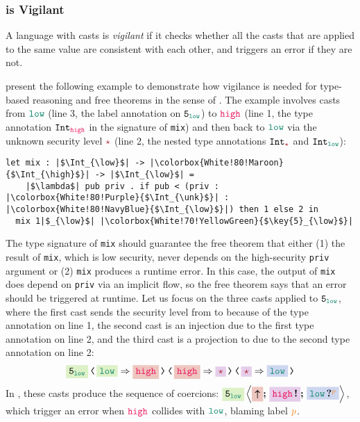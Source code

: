 \subsubsection{\Surface is Vigilant}

A language with casts is \textit{vigilant} if it checks whether all the casts
that are applied to the same value are consistent with each other, and triggers
an error if they are not.

\textcite{Toro:2018aa} present the following example to demonstrate how vigilance
is needed for type-based reasoning and free theorems in the sense of
\textcite{Wadler:1989fk}. The example involves casts from $\low$ (line 3, the label
annotation on $\key{5}_{\low}$) to $\high$ (line 1, the type annotation
$\Int_{\high}$ in the signature of \texttt{mix}) and then back to $\low$ via the
unknown security level $\unk$ (line 2, the nested type annotations $\Int_{\unk}$
and $\Int_{\low}$):

\begin{lstlisting}[style=tt]
  let mix : |$\Int_{\low}$| -> |\colorbox{White!80!Maroon}{$\Int_{\high}$}| -> |$\Int_{\low}$| =
    |$\lambda$| pub priv . if pub < (priv : |\colorbox{White!80!Purple}{$\Int_{\unk}$}| : |\colorbox{White!80!NavyBlue}{$\Int_{\low}$}|) then 1 else 2 in
  mix 1|$_{\low}$| |\colorbox{White!70!YellowGreen}{$\key{5}_{\low}$}|
\end{lstlisting}

\noindent The type signature of \texttt{mix} should guarantee the free theorem
that either (1) the result of \texttt{mix}, which is low security, never depends
on the high-security \texttt{priv} argument or (2) \texttt{mix} produces a
runtime error. In this case, the output of \texttt{mix} does depend on
\texttt{priv} via an implicit flow, so the free theorem says that an error
should be triggered at runtime. Let us focus on the three casts applied to
$\key{5}_{\low}$, where the first cast sends the security level from \low to
\high because of the type annotation on line 1, the second cast is an injection
due to the first type annotation on line 2, and the third cast is a projection
to \low due to the second type annotation on line 2:
\[
\cccast{
  \cccast{
    \cccast{\colorbox{White!70!YellowGreen}{$\key{5}_{\low}$}}{\colorbox{White!70!YellowGreen}{\low} \Rightarrow \colorbox{White!80!Maroon}{\high}}
  }{\colorbox{White!80!Maroon}{\high} \Rightarrow \colorbox{White!80!Purple}{\unk}}}
  {\colorbox{White!80!Purple}{\unk} \Rightarrow \colorbox{White!80!NavyBlue}{\low}}
\]
In \Surface, these casts produce the sequence of coercions:
$\colorbox{White!70!YellowGreen}{$\key{5}_{\low}$} \left\langle
\colorbox{White!80!Maroon}{\up} \seq \colorbox{White!80!Purple}{\inj{\high}}
\seq \colorbox{White!80!NavyBlue}{\proj{\low}{p}} \right\rangle$, which trigger
an error when $\high$ collides with $\low$, blaming label $\bl{p}$.

